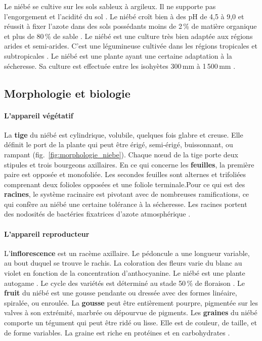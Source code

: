 \documentclass[a4paper,11pt]{article}
\begin{document}
Le niébé se cultive sur les sols sableux à argileux. Il ne supporte
pas l'engorgement et l'acidité du sol \cite{Doggett_1988}. Le niébé
croît bien à des pH de 4,5 à 9,0 et réussit à fixer l'azote dans des
sols possédants moins de 2\,\% de matière organique et plus de 80\,\% de
sable \cite{SINGH_1997}. Le niébé est une culture très bien adaptée
aux régions arides et semi-arides. C'est une légumineuse cultivée
dans les régions tropicales et subtropicales \cite{Doggett_1988}. Le
niébé est une plante ayant une certaine adaptation à la
sécheresse. Sa culture est effectuée entre les isohyètes 300\,mm à
1\,500\,mm \cite{Doggett_1988}.

\subsection{Morphologie et biologie}


\paragraph{L'appareil végétatif} La \textbf{tige} du niébé est
cylindrique, volubile, quelques fois glabre et creuse. Elle définit le
port de la plante qui peut être érigé, semi-érigé, buissonnant, ou
rampant (fig.~\ref{fig:morphologie_niebe}). Chaque nœud de la tige
porte deux stipules et trois bourgeons axillaires. En ce qui concerne
les \textbf{feuilles}, la première paire est opposée et
monofoliée. Les secondes feuilles sont alternes et trifoliées
comprenant deux folioles opposées et une foliole terminale.Pour ce qui
est des \textbf{racines}, le système racinaire est pivotant avec de
nombreuses ramifications, ce qui confère au niébé une certaine
tolérance à la sécheresse. Les racines portent des nodosités de
bactéries fixatrices d'azote atmosphérique \cite{Doggett_1988}.

\paragraph{L'appareil reproducteur} L'\textbf{inflorescence} est un
racème axillaire. Le pédoncule a une longueur variable, au bout duquel
se trouve le rachis. La coloration des fleurs varie du blanc au violet
en fonction de la concentration d'anthocyanine. Le niébé est une
plante autogame \cite{Fery}. Le cycle des variétés est déterminé au
stade 50\,\% de floraison \cite{Drabo_1981}. Le \textbf{fruit} du
niébé est une gousse pendante ou dressée avec des formes linéaire,
spiralée, ou enroulée. La \textbf{gousse} peut être entièrement
pourpre, pigmentée sur les valves à son extrémité, marbrée ou
dépourvue de pigments. Les \textbf{graines} du niébé comporte un
tégument qui peut être ridé ou lisse. Elle est de couleur, de taille,
et de forme variables. La graine est riche en protéines et en
carbohydrates \cite{Doggett_1988}.
\end{document}
